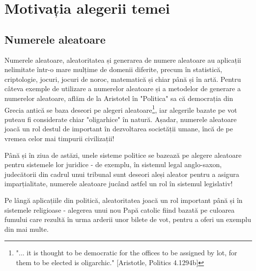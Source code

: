 \iffalse
Introducerea va avea 2–3 pagini care vor conține motivația alegerii temei, relevanța și contextul temei alese, obiectivele generale ale lucrării, metodologia și instrumentele utilizate și o scurtă descriere a structurii lucrării (titlul capitolelor, o scurtă descriere și legătura dintre acestea).

În acest capitol nu se introduc figuri, table sau listing-uri de cod. Pot fi în schimb referite!
\fi
\renewcommand{\thesection}{\Roman{section}}
\renewcommand{\thesubsection}{\thesection.\Roman{subsection}}
\section{Motivația alegerii temei}
\subsection{Numerele aleatoare}
Numerele aleatoare, aleatoritatea și generarea de numere aleatoare au aplicații nelimitate într-o mare mulțime de domenii diferite, precum în statistică, criptologie, jocuri, jocuri de noroc, matematică și chiar până și în artă.
Pentru câteva exemple de utilizare a numerelor aleatoare și a metodelor de generare a numerelor aleatoare, aflăm de la Aristotel în "Politica" sa \cite{book:aristotle:2015} că democrația din Grecia antică se baza deseori pe alegeri aleatoare\footnote{"... it is thought to be democratic for the offices to be assigned by lot, for them to be elected is oligarchic." [Aristotle, Politics 4.1294b]}, iar alegerile bazate pe vot puteau fi considerate chiar "oligarhice" în natură. Așadar, numerele aleatoare joacă un rol destul de important în dezvoltarea societății umane, încă de pe vremea celor mai timpurii civilizații!

Până și în ziua de astăzi, unele sisteme politice se bazează pe alegere aleatoare pentru sistemele lor juridice - de exemplu, în sistemul legal anglo-saxon, judecătorii din cadrul unui tribunal sunt deseori aleși aleator pentru a asigura imparțialitate, numerele aleatoare jucând astfel un rol în sistemul legislativ!

Pe lângă aplicațiile din politică, aleatoritatea joacă un rol important până și în sistemele religioase - alegerea unui nou Papă catolic fiind bazată pe culoarea fumului care rezultă în urma arderii unor bilete de vot, pentru a oferi un exemplu din mai multe.

